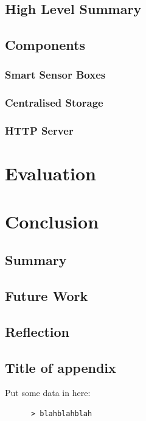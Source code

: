 \documentclass{l4proj}
\begin{document}
\section{High Level Summary}
\section{Components}
\subsection{Smart Sensor Boxes}
\subsection{Centralised Storage}
\subsection{HTTP Server}


\chapter{Evaluation}



\chapter{Conclusion}
\section{Summary}
\section{Future Work}
\section{Reflection}


\begin{appendices}

\chapter{Title of appendix}
Put some data in here:
\begin{verbatim}
      > blahblahblah
\end{verbatim}

\end{appendices}




\end{document}
